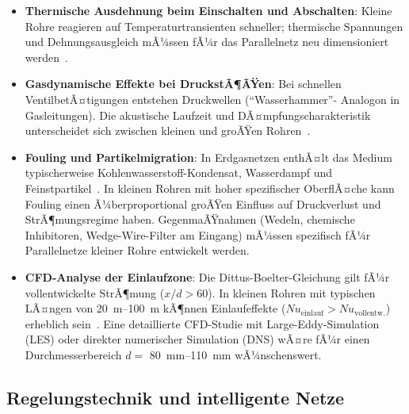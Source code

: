 ﻿\documentclass[12pt,a4paper,twoside]{article}
\theoremstyle{plain}
\theoremstyle{definition}
\theoremstyle{remark}
\begin{document}
\begin{itemize}
  \item \textbf{Thermische Ausdehnung beim Einschalten und Abschalten}:
        Kleine Rohre reagieren auf Temperaturtransienten schneller;
        thermische Spannungen und Dehnungsausgleich mÃ¼ssen
        fÃ¼r das Parallelnetz neu dimensioniert werden~\cite{TimoshenkoWoinowsky2009}.

  \item \textbf{Gasdynamische Effekte bei DruckstÃ¶ÃŸen}:
        Bei schnellen VentilbetÃ¤tigungen entstehen Druckwellen (``Wasserhammer''-
        Analogon in Gasleitungen).
        Die akustische Laufzeit und DÃ¤mpfungscharakteristik unterscheidet sich
        zwischen kleinen und groÃŸen Rohren~\cite{Wylie1993}.

  \item \textbf{Fouling und Partikelmigration}:
        In Erdgasnetzen enthÃ¤lt das Medium typischerweise Kohlenwasserstoff-Kondensat,
        Wasserdampf und Feinstpartikel~\cite{Mokhatab2019}.
        In kleinen Rohren mit hoher spezifischer OberflÃ¤che kann Fouling
        einen Ã¼berproportional groÃŸen Einfluss auf Druckverlust und
        StrÃ¶mungsregime haben.
        GegenmaÃŸnahmen (Wedeln, chemische Inhibitoren, Wedge-Wire-Filter am
        Eingang) mÃ¼ssen spezifisch fÃ¼r Parallelnetze kleiner Rohre entwickelt
        werden.

  \item \textbf{CFD-Analyse der Einlaufzone}:
        Die Dittus-Boelter-Gleichung gilt fÃ¼r vollentwickelte StrÃ¶mung
        ($x/d > 60$).
        In kleinen Rohren mit typischen LÃ¤ngen von \SIrange{20}{100}{\metre}
        kÃ¶nnen Einlaufeffekte ($Nu_{\text{einlauf}} > Nu_{\text{vollentw.}}$)
        erheblich sein~\cite{Shah1978}.
        Eine detaillierte CFD-Studie mit Large-Eddy-Simulation (LES) oder
        direkter numerischer Simulation (DNS) wÃ¤re fÃ¼r einen Durchmesserbereich
        $d = $ \SIrange{80}{110}{\milli\metre} wÃ¼nschenswert.
\end{itemize}

\subsection{Regelungstechnik und intelligente Netze}
\label{ssec:ausblick_regelung}
\end{document}
